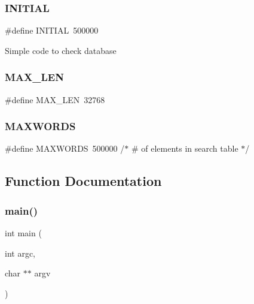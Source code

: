 \subsubsection{\texorpdfstring{INITIAL}{INITIAL}}
{\footnotesize\ttfamily \#define I\+N\+I\+T\+I\+AL~500000}

Simple code to check database \mbox{\label{adat-devel_2other__libs_2filedb_2filehash_2tcheck_8c_aabf4f709c8199e41cf279c77112345fe}} 
\subsubsection{\texorpdfstring{MAX\_LEN}{MAX\_LEN}}
{\footnotesize\ttfamily \#define M\+A\+X\+\_\+\+L\+EN~32768}

\mbox{\label{adat-devel_2other__libs_2filedb_2filehash_2tcheck_8c_aa6b319146daf33409da1bbe4194553dc}} 
\subsubsection{\texorpdfstring{MAXWORDS}{MAXWORDS}}
{\footnotesize\ttfamily \#define M\+A\+X\+W\+O\+R\+DS~500000	       /$\ast$ \# of elements in search table $\ast$/}



\subsection{Function Documentation}
\mbox{\label{adat-devel_2other__libs_2filedb_2filehash_2tcheck_8c_a3c04138a5bfe5d72780bb7e82a18e627}} 
\subsubsection{\texorpdfstring{main()}{main()}}
{\footnotesize\ttfamily int main (\begin{DoxyParamCaption}\item[{int}]{argc,  }\item[{char $\ast$$\ast$}]{argv }\end{DoxyParamCaption})}

